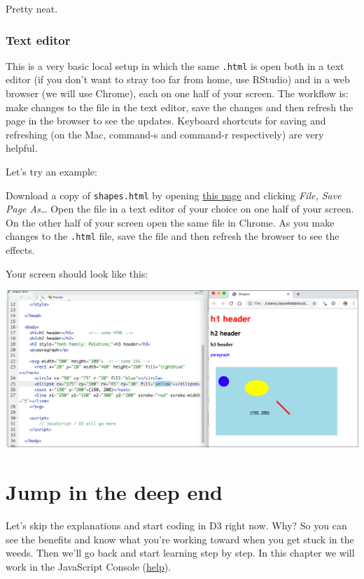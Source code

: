 \documentclass[openany]{book}
\begin{document}
Pretty neat.

\hypertarget{text-editor}{%
\subsection{Text editor}\label{text-editor}}

This is a very basic local setup in which the same \texttt{.html} is open both in a text editor (if you don't want to stray too far from home, use RStudio) and in a web browser (we will use Chrome), each on one half of your screen. The workflow is: make changes to the file in the text editor, save the changes and then refresh the page in the browser to see the updates. Keyboard shortcuts for saving and refreshing (on the Mac, command-s and command-r respectively) are very helpful.

Let's try an example:

Download a copy of \texttt{shapes.html} by opening \href{https://raw.githubusercontent.com/jtr13/d3book/master/code/shapes.html}{this page} and clicking \emph{File, Save Page As\ldots{}} Open the file in a text editor of your choice on one half of your screen. On the other half of your screen open the same file in Chrome. As you make changes to the \texttt{.html} file, save the file and then refresh the browser to see the effects.

Your screen should look like this:

\begin{center}\includegraphics[width=0.8\linewidth]{images/editor_chrome} \end{center}

\hypertarget{jump}{%
\chapter{Jump in the deep end }\label{jump}}

Let's skip the explanations and start coding in D3 right now. Why? So you can see the benefits and know what you're working toward when you get stuck in the weeds. Then we'll go back and start learning step by step. In this chapter we will work in the JavaScript Console (\href{index.html\#javascript-console}{help}).
\end{document}
